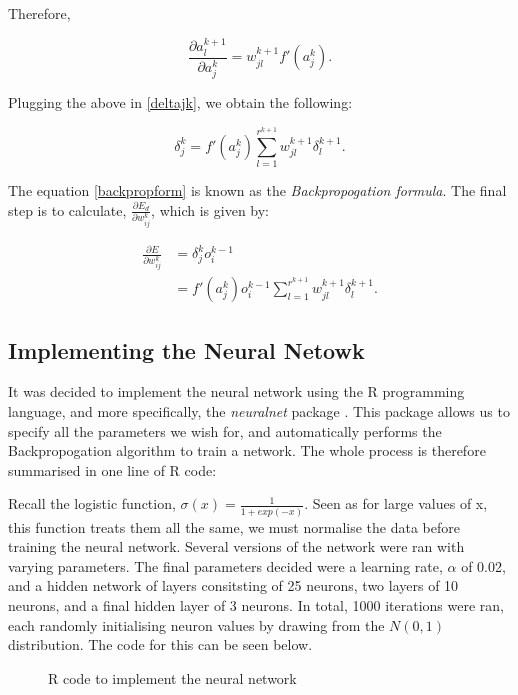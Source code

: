 Therefore,

\begin{equation}
    \frac{\partial a_l^{k+1}}{\partial a_j^k} = w_{jl}^{k+1}f'(a_j^k).
\end{equation}

Plugging the above in \ref{deltajk}, we obtain the following:

\begin{equation}
    \label{backpropform}
    \delta_j^k = f'(a_j^k)\sum^{r^{k+1}}_{l=1}w_{jl}^{k+1}\delta_l^{k+1}.
\end{equation}

The equation \ref{backpropform} is known as the \textit{Backpropogation formula}. The final step is to calculate, $\frac{\partial E_d}{\partial w_{ij}^k}$, which is given by:

\begin{align}
        \frac{\partial E}{\partial w_{ij}^k} &= \delta^k_jo_i^{k-1} \\
        &=f'(a_j^k)o^{k-1}_i \sum^{r^{k+1}}_{l=1}w_{jl}^{k+1}\delta_l^{k+1}.
\end{align}


\subsection{Implementing the Neural Netowk}
It was decided to implement the neural network using the R programming language, and more specifically, the \textit{neuralnet} package \cite{gunther}. This package 
allows us to specify all the parameters we wish for, and automatically performs the Backpropogation algorithm to train a network. The whole process is therefore summarised in one line of R code:

Recall the logistic function, $\sigma(x) = \frac{1}{1+exp(-x)}$. Seen as for large values of x, this function treats them all the same, we must normalise the data before training the neural 
network. Several versions of the network were ran with varying parameters. The final parameters decided were a learning rate, $\alpha$ of 0.02, and a hidden network of layers consitsting of 
25 neurons, two layers of 10 neurons, and a final hidden layer of 3 neurons. In total, 1000 iterations were ran, each randomly initialising neuron values by drawing from the $N(0,1)$ distribution. 
The code for this can be seen below.

\begin{figure}[h] %
    
    \caption{R code to implement the neural network}
\end{figure}

